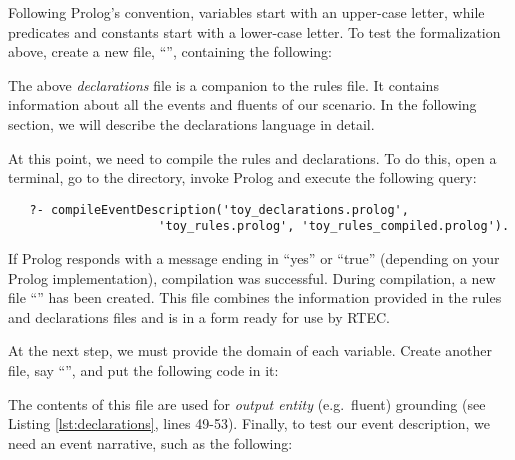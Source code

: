 \begin{minipage}{\linewidth}

\end{minipage}

Following Prolog's convention, variables start with an upper-case letter, while predicates and constants start with a lower-case letter. To test the formalization above, create a new file, ``'', containing the following:



The above \emph{declarations} file is a companion to the rules file. It contains information about all the events and fluents of our scenario. In the following section, we will describe the declarations language in detail.

At this point, we need to compile the rules and declarations. To do this, open a terminal, go to the  directory, invoke Prolog and execute the following query:

{\small
\begin{verbatim}
   ?- compileEventDescription('toy_declarations.prolog',
                     'toy_rules.prolog', 'toy_rules_compiled.prolog').
\end{verbatim}
}

If Prolog responds with a message ending in ``yes'' or ``true'' (depending on your Prolog implementation), compilation was successful. During compilation, a new file ``'' has been created. This file combines the information provided in the rules and declarations files and is in a form ready for use by RTEC. 

At the next step, we must provide the domain of each variable. Create another file, say ``'', and put the following code in it:

\begin{minipage}{\linewidth}

\end{minipage}

The contents of this file are used for \emph{output entity} (e.g.~fluent) grounding (see Listing \ref{lst:declarations}, lines 49-53). 
Finally, to test our event description, we need an event narrative, such as the following:

